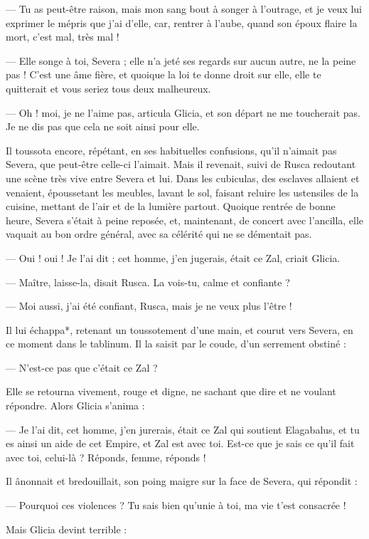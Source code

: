 \documentclass[a4paper, 11pt, oneside, polutonikogreek, french]{article}
\begin{document}
--- Tu as peut-être raison, mais mon sang bout à songer à l'outrage, et je veux lui exprimer le mépris que j'ai d'elle, car, rentrer à l'aube, quand son époux flaire la mort, c'est mal, très mal !

--- Elle songe à toi, Severa ; elle n'a jeté ses regards sur aucun autre, ne la peine pas ! C'est une âme fière, et quoique la loi te donne droit sur elle, elle te quitterait et vous seriez tous deux malheureux.

--- Oh ! moi, je ne l'aime pas, articula Glicia, et son départ ne me toucherait pas. Je ne dis pas que cela ne soit ainsi pour elle.

Il toussota encore, répétant, en ses habituelles confusions, qu'il n'aimait pas Severa, que peut-être celle-ci l'aimait. Mais il revenait, suivi de Rusca redoutant une scène très vive entre Severa et lui. Dans les cubiculas, des esclaves allaient et venaient, époussetant les meubles, lavant le sol, faisant reluire les ustensiles de la cuisine, mettant de l'air et de la lumière partout. Quoique rentrée de bonne heure, Severa s'était à peine reposée, et, maintenant, de concert avec l'ancilla, elle vaquait au bon ordre général, avec sa célérité qui ne se démentait pas.

--- Oui ! oui ! Je l'ai dit ; cet homme, j'en jugerais, était ce Zal, criait Glicia.

--- Maître, laisse-la, disait Rusca. La vois-tu, calme et confiante ?

--- Moi aussi, j'ai été confiant, Rusca, mais je ne veux plus l'être !

Il lui échappa*, retenant un toussotement d'une main, et courut vers Severa, en ce moment dans le tablinum. Il la saisit par le coude, d'un serrement obstiné :

--- N'est-ce pas que c'était ce Zal ?

Elle se retourna vivement, rouge et digne, ne sachant que dire et ne voulant répondre. Alors Glicia s'anima :

--- Je l'ai dit, cet homme, j'en jurerais, était ce Zal qui soutient Elagabalus, et tu es ainsi un aide de cet Empire, et Zal est avec toi. Est-ce que je sais ce qu'il fait avec toi, celui-là ? Réponds, femme, réponds !

Il ânonnait et bredouillait, son poing maigre sur la face de Severa, qui répondit :

--- Pourquoi ces violences ? Tu sais bien qu'unie à toi, ma vie t'est consacrée !

Mais Glicia devint terrible :
\end{document}
